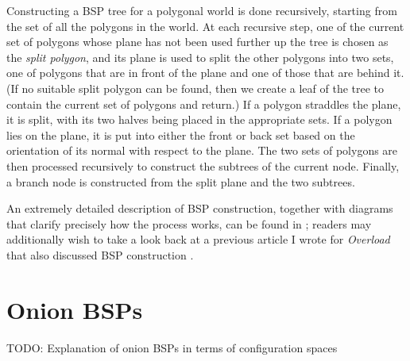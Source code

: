 \documentclass[10pt,twocolumn]{article}
\begin{document}
Constructing a BSP tree for a polygonal world is done recursively, starting from the set of all the polygons in the world. At each recursive step, one of the current set of polygons whose plane has not been used further up the tree is chosen as the \emph{split polygon}, and its plane is used to split the other polygons into two sets, one of polygons that are in front of the plane and one of those that are behind it. (If no suitable split polygon can be found, then we create a leaf of the tree to contain the current set of polygons and return.) If a polygon straddles the plane, it is split, with its two halves being placed in the appropriate sets. If a polygon lies on the plane, it is put into either the front or back set based on the orientation of its normal with respect to the plane. The two sets of polygons are then processed recursively to construct the subtrees of the current node. Finally, a branch node is constructed from the split plane and the two subtrees.

An extremely detailed description of BSP construction, together with diagrams that clarify precisely how the process works, can be found in \cite{golodetz06}; readers may additionally wish to take a look back at a previous article I wrote for \emph{Overload} that also discussed BSP construction \cite{golodetzoverload08aug}.

\section{Onion BSPs}
\label{sec:onionbsps}

TODO: Explanation of onion BSPs in terms of configuration spaces
\end{document}
